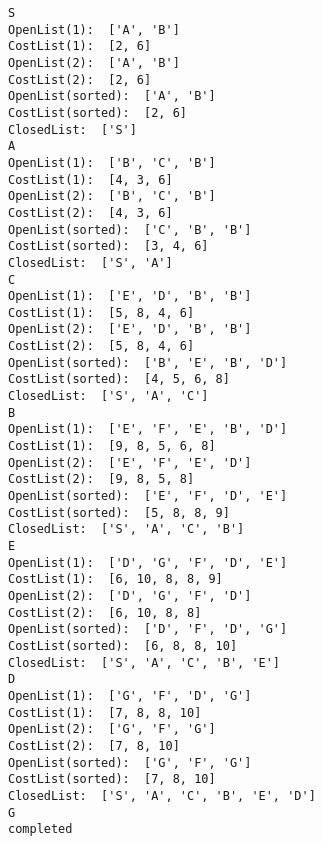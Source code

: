 \documentclass[11pt]{article}
\begin{document}
    \begin{Verbatim}[commandchars=\\\{\}]
S
OpenList(1):  ['A', 'B']
CostList(1):  [2, 6]
OpenList(2):  ['A', 'B']
CostList(2):  [2, 6]
OpenList(sorted):  ['A', 'B']
CostList(sorted):  [2, 6]
ClosedList:  ['S']
A
OpenList(1):  ['B', 'C', 'B']
CostList(1):  [4, 3, 6]
OpenList(2):  ['B', 'C', 'B']
CostList(2):  [4, 3, 6]
OpenList(sorted):  ['C', 'B', 'B']
CostList(sorted):  [3, 4, 6]
ClosedList:  ['S', 'A']
C
OpenList(1):  ['E', 'D', 'B', 'B']
CostList(1):  [5, 8, 4, 6]
OpenList(2):  ['E', 'D', 'B', 'B']
CostList(2):  [5, 8, 4, 6]
OpenList(sorted):  ['B', 'E', 'B', 'D']
CostList(sorted):  [4, 5, 6, 8]
ClosedList:  ['S', 'A', 'C']
B
OpenList(1):  ['E', 'F', 'E', 'B', 'D']
CostList(1):  [9, 8, 5, 6, 8]
OpenList(2):  ['E', 'F', 'E', 'D']
CostList(2):  [9, 8, 5, 8]
OpenList(sorted):  ['E', 'F', 'D', 'E']
CostList(sorted):  [5, 8, 8, 9]
ClosedList:  ['S', 'A', 'C', 'B']
E
OpenList(1):  ['D', 'G', 'F', 'D', 'E']
CostList(1):  [6, 10, 8, 8, 9]
OpenList(2):  ['D', 'G', 'F', 'D']
CostList(2):  [6, 10, 8, 8]
OpenList(sorted):  ['D', 'F', 'D', 'G']
CostList(sorted):  [6, 8, 8, 10]
ClosedList:  ['S', 'A', 'C', 'B', 'E']
D
OpenList(1):  ['G', 'F', 'D', 'G']
CostList(1):  [7, 8, 8, 10]
OpenList(2):  ['G', 'F', 'G']
CostList(2):  [7, 8, 10]
OpenList(sorted):  ['G', 'F', 'G']
CostList(sorted):  [7, 8, 10]
ClosedList:  ['S', 'A', 'C', 'B', 'E', 'D']
G
completed

    \end{Verbatim}
\end{document}
